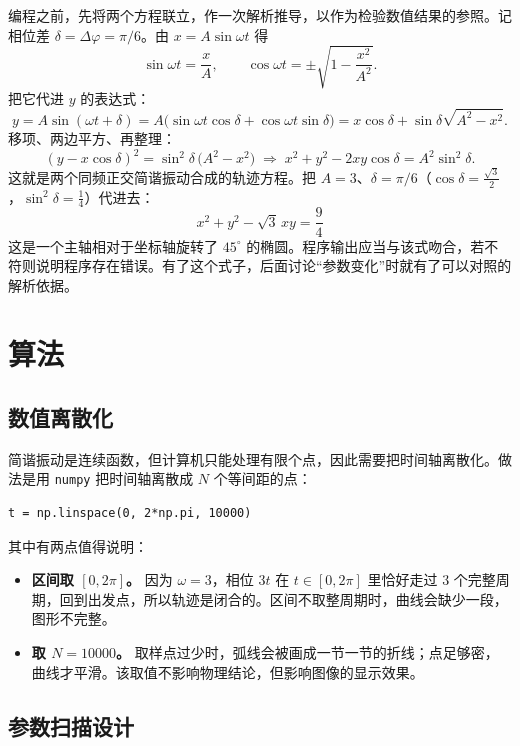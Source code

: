 \documentclass[UTF8,a4paper,12pt]{ctexart}
\begin{document}
编程之前，先将两个方程联立，作一次解析推导，以作为检验数值结果的参照。记相位差 $\delta=\Delta\varphi=\pi/6$。由 $x=A\sin\omega t$ 得
\[
  \sin\omega t=\frac{x}{A},\qquad
  \cos\omega t=\pm\sqrt{1-\frac{x^{2}}{A^{2}}} .
\]
把它代进 $y$ 的表达式：
\[
  y=A\sin(\omega t+\delta)
  =A\big(\sin\omega t\cos\delta+\cos\omega t\sin\delta\big)
  =x\cos\delta+\sin\delta\sqrt{A^{2}-x^{2}} .
\]
移项、两边平方、再整理：
\[
  (y-x\cos\delta)^{2}=\sin^{2}\delta\,\big(A^{2}-x^{2}\big)
  \;\Longrightarrow\;
  x^{2}+y^{2}-2xy\cos\delta = A^{2}\sin^{2}\delta .
\]
这就是两个同频正交简谐振动合成的轨迹方程。把 $A=3$、$\delta=\pi/6$（$\cos\delta=\tfrac{\sqrt3}{2}$，$\sin^{2}\delta=\tfrac14$）代进去：
\begin{equation}
  \boxed{\,x^{2}+y^{2}-\sqrt{3}\,xy=\frac{9}{4}\,}
\end{equation}
这是一个主轴相对于坐标轴旋转了 $45^\circ$ 的椭圆。程序输出应当与该式吻合，若不符则说明程序存在错误。有了这个式子，后面讨论“参数变化”时就有了可以对照的解析依据。

\section{算法}

\subsection{数值离散化}

简谐振动是连续函数，但计算机只能处理有限个点，因此需要把时间轴离散化。做法是用 \texttt{numpy} 把时间轴离散成 $N$ 个等间距的点：

\begin{lstlisting}
t = np.linspace(0, 2*np.pi, 10000)
\end{lstlisting}

其中有两点值得说明：

\begin{itemize}
  \item \textbf{区间取 $[0,2\pi]$。} 因为 $\omega=3$，相位 $3t$ 在 $t\in[0,2\pi]$ 里恰好走过 $3$ 个完整周期，回到出发点，所以轨迹是闭合的。区间不取整周期时，曲线会缺少一段，图形不完整。
  \item \textbf{取 $N=10000$。} 取样点过少时，弧线会被画成一节一节的折线；点足够密，曲线才平滑。该取值不影响物理结论，但影响图像的显示效果。
\end{itemize}

\subsection{参数扫描设计}
\end{document}
